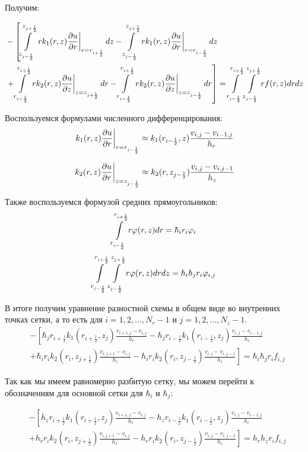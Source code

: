 Получим:

\begin{align*}
  &- \left [
   \mLimZ{z}{+\frac{1}{2}}{-\frac{1}{2}}{j}  \left . r k_1(r, z) \pdv{u}{r} \right \vert_{r = r_{i + \frac{1}{2}}} dz
  - \mLimZ{z}{+\frac{1}{2}}{-\frac{1}{2}}{j} \left . r k_1(r, z) \pdv{u}{r} \right \vert_{r = r_{i - \frac{1}{2}}} dz
  \right . \\
  &\left . + \mLimS{r}{+\frac{1}{2}}{-\frac{1}{2}} \left . rk_2(r, z)\pdv{u}{z} \right \vert_{z = z_{j + \frac{1}{2}}} dr
  - \mLimS{r}{+\frac{1}{2}}{-\frac{1}{2}} \left . rk_2(r, z)\pdv{u}{z} \right \vert_{z = z_{j - \frac{1}{2}}} dr
  \right ] = \mLim{+\frac{1}{2}}{-\frac{1}{2}}{+\frac{1}{2}}{-\frac{1}{2}} rf(r, z) dr dz
\end{align*}

Воспользуемся формулами численного дифференцирования:
\[
  \left . k_1(r, z) \pdv{u}{r} \right \vert_{r = r_{i - \frac{1}{2}}}
  \approx k_1(r_{i - \frac{1}{2}}, z) 
  \frac{v_{i, j} - v_{i - 1, j}}{h_r}
\]

\[
  \left . k_2(r, z) \pdv{u}{r} \right \vert_{z = z_{j - \frac{1}{2}}}
  \approx k_2(r, z_{j - \frac{1}{2}}) 
  \frac{v_{i, j} - v_{i, j - 1}}{h_z}
\]

Также воспользуемся формулой средних прямоугольников:
\[
  \mLimS{r}{+\frac{1}{2}}{-\frac{1}{2}} r \varphi(r, z) dr
  = \hbar_i r_i \varphi_i
\]
\[
  \mLim{+\frac{1}{2}}{-\frac{1}{2}}{+\frac{1}{2}}{-\frac{1}{2}} r \varphi(r, z) drdz
  = \hbar_i\hbar_j r_i \varphi_{i, j}
\]

В итоге получим уравнение разностной схемы в общем виде во внутренних точках сетки, а то есть для
$ i = 1, 2, \dots, N_r - 1 $ и $ j = 1, 2, \dots, N_z - 1$.
\begin{align*}
  &- \left [ 
  \hbar_j r_{i+\frac{1}{2}} k_1(r_{i+\frac{1}{2}}, z_j) \frac{v_{i+1, j} - v_{i, j}}{h_{r}}
  - \hbar_j r_{i-\frac{1}{2}} k_1(r_{i-\frac{1}{2}}, z_j) \frac{v_{i, j} - v_{i - 1, j}}{h_{r}}
  \right . \\
  &\left .
  + \hbar_i r_{i} k_2(r_i, z_{j+\frac{1}{2}}) \frac{v_{i, j + 1} - v_{i, j}}{h_{z}}
  - \hbar_i r_{i} k_2(r_i, z_{j-\frac{1}{2}}) \frac{v_{i, j} - v_{i, j - 1}}{h_z}
  \right ]  = \hbar_i \hbar_j r_i f_{i, j}
\end{align*}

Так как мы имеем равномерно разбитую сетку, мы можем перейти к обозначениям для основной сетки для $ \hbar_i $ и $ \hbar_j $:

\begin{align*}
  &- \left [ 
  h_z r_{i+\frac{1}{2}} k_1(r_{i+\frac{1}{2}}, z_j) \frac{v_{i+1, j} - v_{i, j}}{h_{r}}
  - h_z r_{i-\frac{1}{2}} k_1(r_{i-\frac{1}{2}}, z_j) \frac{v_{i, j} - v_{i - 1, j}}{h_{r}}
  \right . \\
  &\left .
  + h_r r_{i} k_2(r_i, z_{j+\frac{1}{2}}) \frac{v_{i, j + 1} - v_{i, j}}{h_{z}}
  - h_r r_{i} k_2(r_i, z_{j-\frac{1}{2}}) \frac{v_{i, j} - v_{i, j - 1}}{h_z}
  \right ]  = h_r h_z r_i f_{i, j}
\end{align*}

